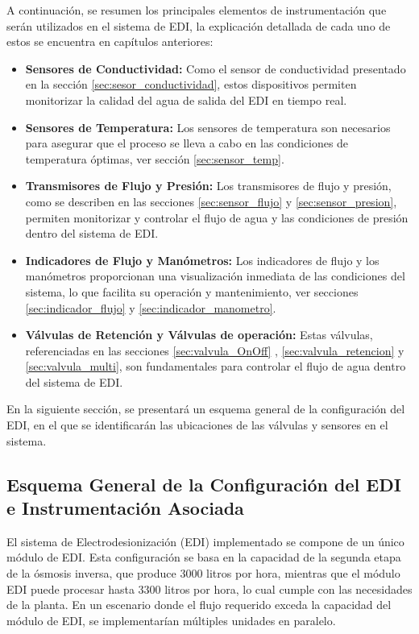 A continuación, se resumen los principales elementos de instrumentación que serán utilizados en el sistema de EDI, la explicación detallada de cada uno de estos se encuentra en capítulos anteriores:
\begin{itemize}
    \item \textbf{Sensores de Conductividad:} Como el sensor de conductividad presentado en la sección \ref{sec:sesor_conductividad}, estos dispositivos permiten monitorizar la calidad del agua de salida del EDI en tiempo real.

    \item \textbf{Sensores de Temperatura:} Los sensores de temperatura son necesarios para asegurar que el proceso se lleva a cabo en las condiciones de temperatura óptimas, ver sección \ref{sec:sensor_temp}.

    \item \textbf{Transmisores de Flujo y Presión:} Los transmisores de flujo y presión, como se describen en las secciones \ref{sec:sensor_flujo} y \ref{sec:sensor_presion}, permiten monitorizar y controlar el flujo de agua y las condiciones de presión dentro del sistema de EDI.

    \item \textbf{Indicadores de Flujo y Manómetros:} Los indicadores de flujo y los manómetros proporcionan una visualización inmediata de las condiciones del sistema, lo que facilita su operación y mantenimiento, ver secciones \ref{sec:indicador_flujo} y \ref{sec:indicador_manometro}.

    \item \textbf{Válvulas de Retención y Válvulas de operación:} Estas válvulas, referenciadas en las secciones \ref{sec:valvula_OnOff} , \ref{sec:valvula_retencion} y \ref{sec:valvula_multi}, son fundamentales para controlar el flujo de agua dentro del sistema de EDI.
\end{itemize}

En la siguiente sección, se presentará un esquema general de la configuración del EDI, en el que se identificarán las ubicaciones de las válvulas y sensores en el sistema.



\subsection{Esquema General de la Configuración del EDI e Instrumentación Asociada}

El sistema de Electrodesionización (EDI) implementado se compone de un único módulo de EDI.
Esta configuración se basa en la capacidad de la segunda etapa de la ósmosis inversa, que
produce 3000 litros por hora, mientras que el módulo EDI puede procesar hasta 3300 litros por hora,
lo cual cumple con las necesidades de la planta. En un escenario donde el flujo requerido exceda la
capacidad del módulo de EDI, se implementarían múltiples unidades en paralelo.

